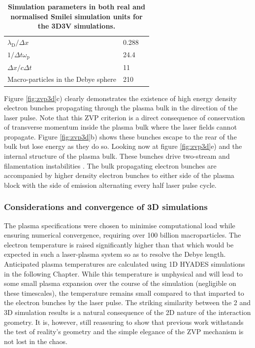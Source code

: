 \begin{table}[]
\begin{center}
\begin{tabular}{lll}
		$\lambda_\mathrm{D}/\Delta x$                               &0.288                                   &  \\
		$1/\Delta t \omega_\mathrm{p}$                             &24.4                                   &  \\
		$\Delta x/c\Delta t$                             &   11                               &  \\
		Macro-particles in the Debye sphere                    &210                                  &  \vspace{0.15cm}\\ \hline \hline 

	\end{tabular}
	\end{center}
	\caption{\label{tab:parameters} \textbf{Simulation parameters in both real and normalised Smilei simulation units for the 3D3V simulations.} }
\end{table}
Figure \ref{fig:zvp3d}c) clearly demonstrates the existence of high energy density electron bunches propagating through the plasma bulk in the direction of the laser pulse. Note that this ZVP criterion is a direct consequence of conservation of transverse momentum inside the plasma bulk where the laser fields cannot propagate. Figure \ref{fig:zvp3d}b) shows these bunches escape to the rear of the bulk but lose energy as they do so. Looking now at figure \ref{fig:zvp3d}e) and the internal structure of the plasma bulk. These bunches drive two-stream and filamentation instabilities \cite{bretMultidimensionalElectronBeamplasma2010}. The bulk propagating electron bunches are accompanied by higher density electron bunches to either side of the plasma block with the side of emission alternating every half laser pulse cycle. 

\subsubsection{Considerations and convergence of 3D simulations}
The plasma specifications were chosen to minimise computational load while ensuring numerical convergence, requiring over 100 billion macroparticles. The electron temperature is raised significantly higher than that which would be expected in such a laser-plasma system so as to resolve the Debye length. Anticipated plasma temperatures are calculated using 1D HYADES simulations in the following Chapter. While this temperature is unphysical and will lead to some small plasma expansion over the course of the simulation (negligible on these timescales), the temperature remains small compared to that imparted to the electron bunches by the laser pulse. The striking similarity between the 2 and 3D simulation results is a natural consequence of the 2D nature of the interaction geometry. It is, however, still reassuring to show that previous work withstands the test of reality's geometry and the simple elegance of the ZVP mechanism is not lost in the chaos. 

